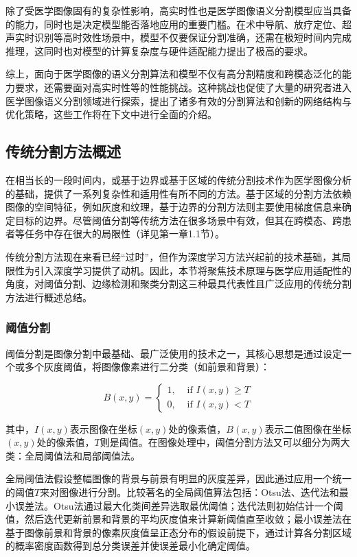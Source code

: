 除了受医学图像固有的复杂性影响，高实时性也是医学图像语义分割模型应当具备的能力，同时也是决定模型能否落地应用的重要门槛。在术中导航、放疗定位、超声实时识别等高时效性场景中，模型不仅要保证分割准确，还需在极短时间内完成推理，这同时也对模型的计算复杂度与硬件适配能力提出了极高的要求。

综上，面向于医学图像的语义分割算法和模型不仅有高分割精度和跨模态泛化的能力要求，还需要面对高实时性等的性能挑战。这种挑战也促使了大量的研究者进入医学图像语义分割领域进行探索，提出了诸多有效的分割算法和创新的网络结构与优化策略，这些工作将在下文中进行全面的介绍。

\subsection{传统分割方法概述}

在相当长的一段时间内，或基于边界或基于区域的传统分割技术作为医学图像分析的基础，提供了一系列复杂性和适用性有所不同的方法。基于区域的分割方法依赖图像的空间特征，例如灰度和纹理，基于边界的分割方法则主要使用梯度信息来确定目标的边界。尽管阈值分割等传统方法在很多场景中有效\cite{xu2024}，但其在跨模态、跨患者等任务中存在很大的局限性（详见第一章1.1节）。

传统分割方法现在来看已经“过时”，但作为深度学习方法兴起前的技术基础，其局限性为引入深度学习提供了动机。因此，本节将聚焦技术原理与医学应用适配性的角度，对阈值分割、边缘检测和聚类分割这三种最具代表性且广泛应用的传统分割方法进行概述总结。

\subsubsection{阈值分割}

阈值分割是图像分割中最基础、最广泛使用的技术之一，其核心思想是通过设定一个或多个灰度阈值，将图像像素进行二分类（如前景和背景）：

\begin{equation}
B(x, y)=\left\{\begin{array}{ll}1, & \text { if } I(x, y) \geq T \\ 0, & \text { if } I(x, y)<T\end{array}\right.
\end{equation}

其中，$I(x, y)$表示图像在坐标$(x, y)$处的像素值，$B(x, y)$表示二值图像在坐标$(x, y)$处的像素值，$T$则是阈值。在图像处理中，阈值分割方法又可以细分为两大类：全局阈值法和局部阈值法。

全局阈值法假设整幅图像的背景与前景有明显的灰度差异，因此通过应用一个统一的阈值$T$来对图像进行分割。比较著名的全局阈值算法包括：Otsu法、迭代法和最小误差法。Otsu法通过最大化类间差异选取最优阈值；迭代法则初始估计一个阈值，然后迭代更新前景和背景的平均灰度值来计算新阈值直至收敛；最小误差法在基于图像前景和背景的像素灰度值呈正态分布的假设前提下，通过计算各分割区域的概率密度函数得到总分类误差并使误差最小化确定阈值。

